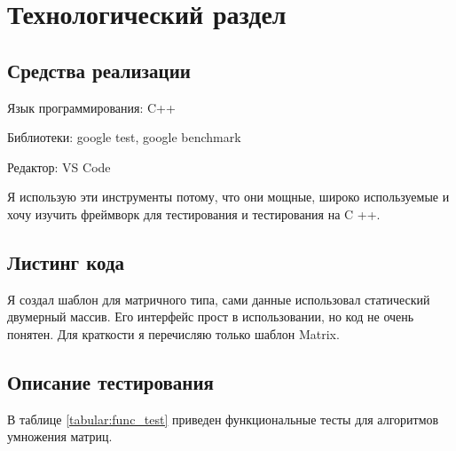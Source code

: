 \chapter{Технологический раздел}
\label{cha:impl}



\section{Средства реализации}

Язык программирования: C++

Библиотеки: google test, google benchmark

Редактор: VS Code

Я использую эти инструменты потому, что они мощные, широко используемые и
хочу изучить фреймворк для тестирования и тестирования на C ++.



\section{Листинг кода}

Я создал шаблон для матричного типа, сами данные использовал статический двумерный массив.
Его интерфейс прост в использовании, но код не очень понятен. Для краткости я перечисляю только шаблон Matrix.











\section{Описание тестирования}

В таблице \ref{tabular:func_test} приведен функциональные тесты
для алгоритмов умножения матриц.

